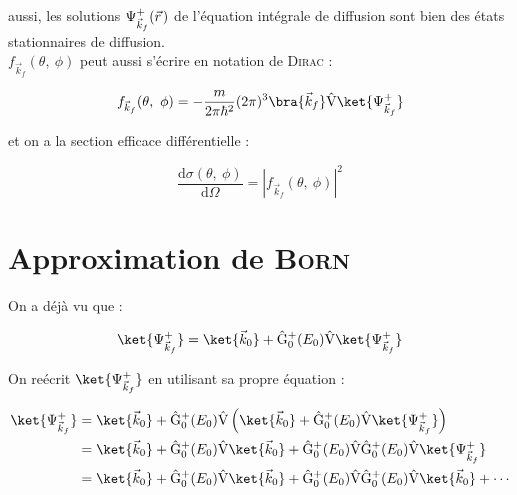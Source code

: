 \documentclass[12pt,a4paper,oneside,french]{book}
\newcommand{\opr}[1]{\mathrm{\hat{#1}}}
\newcommand{\diff}{\mathrm{d}}
\newcommand{\pvec}[1]{\vec{#1} \mkern2mu \vphantom{#1}}
\theoremstyle{definition}
\theoremstyle{definition}
\theoremstyle{definition}
\theoremstyle{remark}
\theoremstyle{definition}
\begin{document}
    aussi, les solutions ${\Psi}_{{\vec{k}}_{f}}^{+}(\pvec{r})$ de l'équation intégrale de diffusion sont bien des états stationnaires de diffusion. \\
    
    ${f}_{{\vec{k}}_{f}}(\theta, \ \phi)$ peut aussi s'écrire en notation de \textsc{Dirac} :
    
    \begin{equation*}
        {f}_{{\vec{k}}_{f}}(\theta, \ \phi) = -\frac{m}{2\pi {\hbar}^{2}} (2\pi)^{3} \bra{{\vec{k}}_{f} \vphantom{{\Psi}_{{\vec{k}}_{f}}^{+}}} \opr{V} \ket{{\Psi}_{{\vec{k}}_{f}}^{+}}
    \end{equation*}
    
    et on a la section efficace différentielle :
    
    \begin{equation*}
        \frac{\diff \sigma(\theta, \ \phi)}{\diff \Omega} = {\left\lvert{f}_{{\vec{k}}_{f}}(\theta, \ \phi)\right\rvert}^{2}
    \end{equation*}
    
    \section{Approximation de \textsc{Born}}
    On a déjà vu que :
    
    \begin{equation*}
        \ket{{\Psi}_{{\vec{k}}_{f}}^{+}} = \ket{{\vec{k}}_{0} \vphantom{{\Psi}_{{\vec{k}}_{f}}^{+}}} + {\opr{G}}_{0}^{+}({E}_{0}) \opr{V} \ket{{\Psi}_{{\vec{k}}_{f}}^{+}}
    \end{equation*}
    
    On reécrit $\ket{{\Psi}_{{\vec{k}}_{f}}^{+}}$ en utilisant sa propre équation :
    
    \begin{equation} \label{chap3_eq/19}
    \begin{split}
        \ket{{\Psi}_{{\vec{k}}_{f}}^{+}} 
            &= \ket{{\vec{k}}_{0} \vphantom{{\Psi}_{{\vec{k}}_{f}}^{+}}} + {\opr{G}}_{0}^{+}({E}_{0}) \opr{V} \left(\ket{{\vec{k}}_{0} \vphantom{{\Psi}_{{\vec{k}}_{f}}^{+}}} + {\opr{G}}_{0}^{+}({E}_{0}) \opr{V} \ket{{\Psi}_{{\vec{k}}_{f}}^{+}}\right) \\
            &= \ket{{\vec{k}}_{0} \vphantom{{\Psi}_{{\vec{k}}_{f}}^{+}}} + {\opr{G}}_{0}^{+}({E}_{0}) \opr{V} \ket{{\vec{k}}_{0} \vphantom{{\Psi}_{{\vec{k}}_{f}}^{+}}} + {\opr{G}}_{0}^{+}({E}_{0}) \opr{V} {\opr{G}}_{0}^{+}({E}_{0}) \opr{V} \ket{{\Psi}_{{\vec{k}}_{f}}^{+}} \\
            &= \ket{{\vec{k}}_{0} \vphantom{{\Psi}_{{\vec{k}}_{f}}^{+}}} + {\opr{G}}_{0}^{+}({E}_{0}) \opr{V} \ket{{\vec{k}}_{0} \vphantom{{\Psi}_{{\vec{k}}_{f}}^{+}}} + {\opr{G}}_{0}^{+}({E}_{0}) \opr{V} {\opr{G}}_{0}^{+}({E}_{0}) \opr{V} \ket{{\vec{k}}_{0} \vphantom{{\Psi}_{{\vec{k}}_{f}}^{+}}} + \cdots
    \end{split}
    \end{equation}
    
\end{document}
